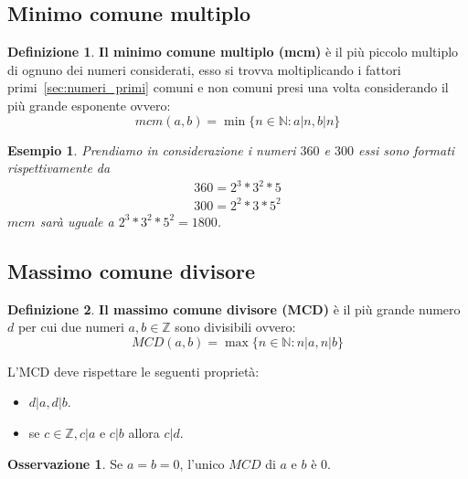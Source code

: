 \documentclass{article}
\newtheorem{exmp}{Esempio}[section]
\theoremstyle{definition}
\newtheorem{definition}{Definizione}[section]
\newtheorem{oss}{Osservazione}[section]
\begin{document}
\subsection{Minimo comune multiplo}\label{sec:mcm}
\begin{definition}
        \textbf{Il minimo comune multiplo (mcm)} è il più piccolo multiplo di ognuno dei numeri considerati, esso si trovva moltiplicando i fattori primi~\ref{sec:numeri_primi} comuni e non comuni presi una volta considerando il più grande esponente ovvero:
        \begin{equation*}
                mcm(a,b) = \min\{n \in \mathbb{N}: a | n, b | n\}
        \end{equation*}
\end{definition}
\begin{exmp}
        Prendiamo in considerazione i numeri $ 360 $ e $ 300 $ essi sono formati rispettivamente da
        \begin{align*}
                360 = 2^3 * 3^2 * 5 \\
                300 = 2^2 * 3 * 5^2 
        \end{align*}
        $ mcm $ sarà uguale a $ 2^3 * 3^2 * 5^2 = 1800 $.  
\end{exmp}



\subsection{Massimo comune divisore}\label{sec:MCD}
\begin{definition}
        \textbf{Il massimo comune divisore (MCD)} è il più grande numero $ d $ per cui due numeri $ a,b \in \mathbb{Z} $ sono divisibili ovvero:
        \begin{equation*}
                MCD(a,b) = \max\{n \in \mathbb{N}: n | a, n|b\}
        \end{equation*}
\end{definition}
L'MCD deve rispettare le seguenti proprietà:
\begin{itemize}
        \item $ d | a, d | b $.
        \item se $c \in \mathbb{Z}, c | a$ e $ c | b $ allora $ c | d $.
\end{itemize}

\begin{oss}
        Se $ a = b = 0 $, l'unico $ MCD $ di $ a $ e $ b $ è $ 0 $.
\end{oss}
\end{document}
